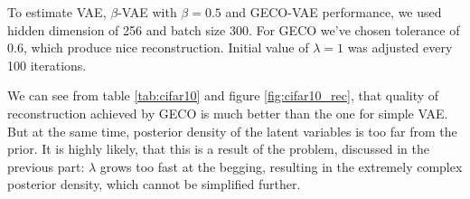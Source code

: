 \documentclass{article}
\begin{document}
To estimate VAE, $\beta$-VAE with $\beta = 0.5$ and GECO-VAE performance, we used hidden dimension of 256 and batch size 300. For GECO we've chosen tolerance of 0.6, which produce nice reconstruction. Initial value of $\lambda = 1$ was adjusted every 100 iterations.

We can see from table \ref{tab:cifar10} and figure \ref{fig:cifar10_rec}, that quality of reconstruction achieved by GECO is much better than the one for simple VAE. But at the same time, posterior density of the latent variables is too far from the prior. It is highly likely, that this is a result of the problem, discussed in the previous part: $\lambda$ grows too fast at the begging, resulting in the extremely complex posterior density, which cannot be simplified further.
\cleardoublepage


\end{document}
